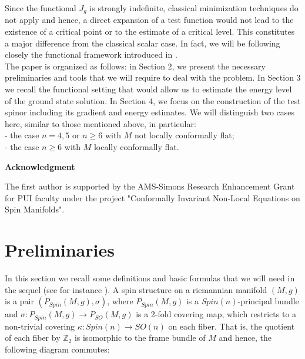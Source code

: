 \documentclass[11pt]{article}
\def \Z {\mathbb{Z}}
\begin{document}
{\noindent
Since the functional $J_{g}$ is strongly indefinite, classical minimization techniques do not apply and hence, a direct expansion of a test function would not lead to the existence of a critical point or to the estimate of a critical level. This constitutes a major difference from the classical scalar case. In fact, we will be following closely the functional framework introduced in \cite{YX1}. \\
The paper is organized as follows: in Section 2, we present the necessary preliminaries and tools that we will require to deal with the problem. In Section 3 we recall the functional setting that would allow us to estimate the energy level of the ground state solution. In Section 4, we focus on the construction of the test spinor including its gradient and energy estimates. We will distinguish two cases here, similar to those mentioned above, in particular: \\
- the case $n=4,5$ or $n\geq 6$ with $M$ not locally conformally flat;\\
- the case $n\geq 6$ with $M$ locally conformally flat.

\vspace{5mm}

{\noindent\bf Acknowledgment}

\noindent
The first author is supported by the AMS-Simons Research Enhancement Grant for PUI faculty under the project "Conformally Invariant
Non-Local Equations on Spin Manifolds".

\section{Preliminaries}

\noindent
In this section we recall some definitions and basic formulas that we will need in the sequel (see for instance \cite{KimFriedrich2000, MaalaouiMartino2022, MMM}). A spin structure on a riemannian manifold $(M,g)$ is a pair $(P_{Spin}(M,g),\sigma)$, where $P_{Spin}(M,g)$ is a $Spin(n)$-principal bundle and $\sigma : P_{Spin}(M,g)\to P_{SO}(M,g)$ is a 2-fold covering map, which restricts to a non-trivial covering $\kappa: Spin(n)\to SO(n)$ on each fiber. That is, the quotient of each fiber by $\Z_{2}$ is isomorphic to the frame bundle of $M$ and hence, the following diagram commutes:
\begin{center}



\end{center}}
\end{document}

